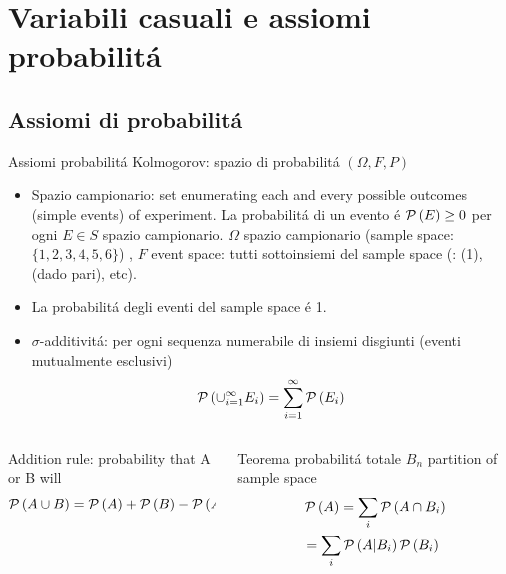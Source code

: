 \documentclass[asd-beamer.tex]{subfiles}%
\begin{document}
\section{Variabili casuali e assiomi probabilit\'a}

\subsection{Assiomi di probabilit\'a}

\begin{frame}{Assiomi probabilit\'a Kolmogorov: spazio di probabilit\'a $(\Omega,F,P)$}
\begin{itemize}
\item Spazio campionario: set enumerating each and every possible outcomes (simple events) of experiment. La probabilit\'a di un evento \'e $\operatorname{\mathcal{P}}{(E)}\geq0$ per ogni $E\in S$ spazio campionario. $\Omega$ spazio campionario (sample space: $\{1,2,3,4,5,6\}$) , $F$ event space: tutti sottoinsiemi del sample space (: (1), (dado pari), etc).
\item La probabilit\'a degli eventi del sample space \'e 1.
\item $\sigma$-additivit\'a: per ogni sequenza numerabile di insiemi disgiunti (eventi mutualmente esclusivi)
\begin{equation*}
\operatorname{\mathcal{P}}{(\cup_{i=1}^{\infty}E_i)}=\sum_{i=1}^{\infty}\operatorname{\mathcal{P}}{(E_i)}
\end{equation*}
\end{itemize}
\begin{columns}[T]
	\begin{column}{0.5\textwidth}
\begin{block}{Addition rule: probability that A or B will}
\begin{equation*}
\operatorname{\mathcal{P}}{(A\cup B)}=\operatorname{\mathcal{P}}{(A)}+\operatorname{\mathcal{P}}{(B)}-\operatorname{\mathcal{P}}{(A\cap B)}
\end{equation*}
\end{block}
\end{column}
\begin{column}{0.5\textwidth}
\begin{block}{Teorema probabilit\'a totale}
$B_n$ partition of sample space
\begin{align*}
&\operatorname{\mathcal{P}}{(A)}=\sum_i\operatorname{\mathcal{P}}{(A\cap B_i)}\\
&=\sum_i\operatorname{\mathcal{P}}{(A|B_i)}\operatorname{\mathcal{P}}{(B_i)}
\end{align*}
\end{block}
\end{column}
\end{columns}
\end{frame}
\end{document}
